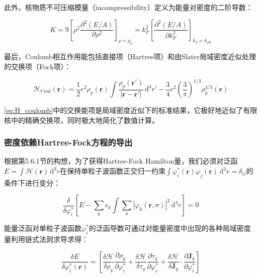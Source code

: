 此外，核物质不可压缩模量（incompressibility）定义为能量对密度的二阶导数：

\begin{equation}
K=9\left[\rho^{2}\frac{\partial^{2}(E/A)}{\partial\rho^{2}}\right]_{\rho=\rho_{0}}=k^{2}_{F}\left[\frac{\partial^{2}(E/A)}{\partial k^{2}_{F}}\right]_{k_{F}=k_{F0}}\label{eq:incompressibility_def}
\end{equation}

最后，Coulomb相互作用能包括直接项（Hartree项）和由Slater局域密度近似处理的交换项（Fock项）：

\begin{equation}
\mathcal{H}_{\mathrm{Coul}}(\boldsymbol{r})=\frac{1}{2}e^{2}\rho_{p}(\boldsymbol{r})\int\frac{\rho_{p}(\boldsymbol{r}')}{|\boldsymbol{r}-\boldsymbol{r}'|}\,\mathrm{d}^{3}r'-\frac{3}{4}e^{2}\left(\frac{3}{\pi}\right)^{1/3}\rho^{4/3}_{p}(\boldsymbol{r})\label{eq:H_coulomb}
\end{equation}

\ref{eq:H_coulomb}中的交换能项是局域密度近似下的标准结果\cite{Sl51a}，它极好地近似了有限核中的精确交换项，同时极大地简化了数值计算。

\subsubsection{密度依赖Hartree-Fock方程的导出\label{subsubsec:=005BC6=005EA6=004F9D=008D56Hartree-Fock=0065B9=007A0B=007684=005BFC=0051FA}}

根据第5.6.1节的构想，为了获得Hartree-Fock Hamilton量，我们必须对泛函$E=\int\mathcal{H}(\boldsymbol{r})\,\mathrm{d}^{3}r$在保持单粒子波函数正交归一约束$\int\varphi^{*}_{i}(\boldsymbol{r})\varphi_{j}(\boldsymbol{r})\,\mathrm{d}^{3}r=\delta_{ij}$的条件下进行变分：

\begin{equation}
\frac{\delta}{\delta\varphi^{*}_{i}}\left[E-\sum_{k}\epsilon_{k}\int\sum_{\sigma}|\varphi_{k}(\boldsymbol{r},\sigma)|^{2}\,\mathrm{d}^{3}r\right]=0\label{eq:skyrme_variation}
\end{equation}

能量泛函对单粒子波函数$\varphi^{*}_{i}$的泛函导数可通过对能量密度中出现的各种局域密度量利用链式法则求导求得：

\begin{equation}
\frac{\delta E}{\delta\varphi^{*}_{i}(\boldsymbol{r})}=\left[\frac{\delta\mathcal{H}}{\delta\rho_{q}}\frac{\partial\rho_{q}}{\partial\varphi^{*}_{i}}+\frac{\delta\mathcal{H}}{\delta\tau_{q}}\frac{\partial\tau_{q}}{\partial\varphi^{*}_{i}}+\frac{\delta\mathcal{H}}{\delta\boldsymbol{J}_{q}}\cdot\frac{\partial\boldsymbol{J}_{q}}{\partial\varphi^{*}_{i}}\right]\label{eq:functional_derivative_chain}
\end{equation}

